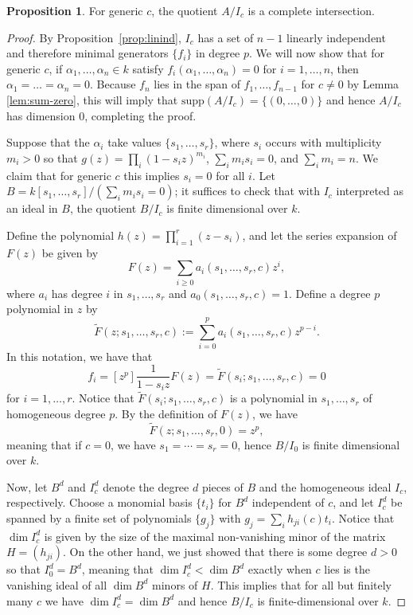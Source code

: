 \documentclass{elsarticle}
\numberwithin{equation}{section}
\theoremstyle{definition}
\newtheorem{proposition}[theorem]{Proposition}
\newcommand{\wF}{\widetilde{F}}
\newcommand{\supp}{\text{supp}}
\begin{document}
\begin{proposition}\label{prop:ci}
For generic $c$, the quotient $A/I_c$ is a complete intersection. 
\end{proposition}
\begin{proof}
By Proposition~\ref{prop:linind}, $I_c$ has a set of $n-1$ linearly independent and therefore minimal generators $\{f_i\}$ in degree $p$.  We will now show that for generic $c$, if $\alpha_1,\dots,\alpha_{n} \in k$ satisfy $f_i(\alpha_1,\dots,\alpha_{n})=0$ for $i = 1, \ldots, n$, then $\alpha_1=\dots=\alpha_{n}=0$.  Because $f_n$ lies in the span of $f_1, \ldots, f_{n - 1}$ for $c \neq 0$ by Lemma \ref{lem:sum-zero}, this will imply that $\supp(A/I_c) = \{(0, \ldots, 0)\}$ and hence $A/I_c$ has dimension $0$, completing the proof.

Suppose that the $\alpha_i$ take values $\{s_1,\dots,s_{r}\}$, where $s_i$ occurs with multiplicity $m_i > 0$ so that $g(z)=\prod_i (1-s_iz)^{m_i}$, $\sum_i m_i s_i = 0$, and $\sum_i m_i = n$.  We claim that for generic $c$ this implies $s_i = 0$ for all $i$. Let $B = k[s_1, \ldots, s_r]/(\sum_i m_i s_i = 0)$; it suffices to check that with $I_c$ interpreted as an ideal in $B$, the quotient $B/I_c$ is finite dimensional over $k$. 

Define the polynomial $h(z) = \prod_{i = 1}^r (z - s_i)$, and let the series expansion of $F(z)$ be given by 
\[
F(z) = \sum_{i \geq 0} a_i(s_1, \ldots, s_r, c) z^i,
\]
where $a_i$ has degree $i$ in $s_1, \ldots, s_r$ and $a_0(s_1, \ldots, s_r, c) = 1$.  Define a degree $p$ polynomial in $z$ by
\[
\wF(z; s_1, \ldots, s_r, c) := \sum_{i = 0}^p a_i(s_1, \ldots, s_r, c) z^{p - i}.
\]
In this notation, we have that 
\[
f_i = [z^p]\frac{1}{1-s_iz}F(z) = \wF(s_i; s_1, \ldots, s_r, c) = 0
\]
for $i = 1, \ldots, r$.  Notice that $\wF(s_i; s_1, \ldots, s_r, c)$ is a polynomial in $s_1, \ldots, s_r$ of homogeneous degree $p$.  By the definition of $F(z)$, we have
\[
\wF(z; s_1, \ldots, s_r, 0) = z^p,
\]
meaning that if $c = 0$, we have $s_1 = \cdots = s_r = 0$, hence $B/I_0$ is finite dimensional over $k$.  

Now, let $B^d$ and $I_c^d$ denote the degree $d$ pieces of $B$ and the homogeneous ideal $I_c$, respectively.  Choose a monomial basis $\{t_i\}$ for $B^d$ independent of $c$, and let $I_c^d$ be spanned by a finite set of polynomials $\{g_j\}$ with $g_j = \sum_i h_{ji}(c) t_i$.  Notice that $\dim I_c^d$ is given by the size of the maximal non-vanishing minor of the matrix $H = (h_{ji})$.  On the other hand, we just showed that there is some degree $d > 0$ so that $I^d_0 = B^d$, meaning that $\dim I^d_c < \dim B^d$ exactly when $c$ lies is the vanishing ideal of all $\dim B^d$ minors of $H$.  This implies that for all but finitely many $c$ we have $\dim I^d_c = \dim B^d$ and hence $B/I_c$ is finite-dimensional over $k$.


\end{proof}
\end{document}
